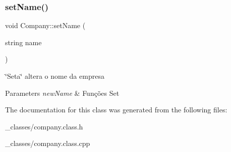 \subsubsection{\texorpdfstring{set\+Name()}{setName()}}
{\footnotesize\ttfamily void Company\+::set\+Name (\begin{DoxyParamCaption}\item[{string}]{name }\end{DoxyParamCaption})}



\char`\"{}\+Seta\char`\"{} altera o nome da empresa 


\begin{DoxyParams}{Parameters}
{\em new\+Name} & Funções Set \\
\hline
\end{DoxyParams}


The documentation for this class was generated from the following files\+:\begin{DoxyCompactItemize}
\item 
\+\_\+classes/company.\+class.\+h\item 
\+\_\+classes/company.\+class.\+cpp\end{DoxyCompactItemize}
